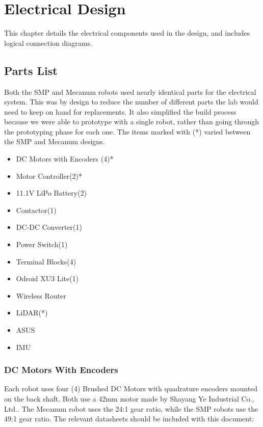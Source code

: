 
\chapter{Electrical Design}
\label{chap:elecdesign}

This chapter details the electrical components used in the design, and includes logical connection diagrams.

\section{Parts List}

Both the SMP and Mecanum robots used nearly identical parts for the electrical system. This was by design to reduce the number of different parts the lab would need to keep on hand for replacements. It also simplified the build process because we were able to prototype with a single robot, rather than going through the prototyping phase for each one. The items marked with (*) varied between the SMP and Mecanum designs.

\begin{itemize}
	\item{DC Motors with Encoders (4)*}
	\item{Motor Controller(2)*}
	\item{11.1V LiPo Battery(2)}
	\item{Contactor(1)}
	\item{DC-DC Converter(1)}
	\item{Power Switch(1)}
	\item{Terminal Blocks(4)}
	\item{Odroid XU3 Lite(1)}
	\item{Wireless Router}
	\item{LiDAR(*)}
	\item{ASUS}
	\item{IMU}
\end{itemize}

\subsection{DC Motors With Encoders}

Each robot uses four (4) Brushed DC Motors with quadrature encoders mounted on the back shaft. Both use a 42mm motor made by Shayang Ye Industrial Co., Ltd.. The Mecanum robot uses the 24:1 gear ratio, while the SMP robots use the 49:1 gear ratio. The relevant datasheets should be included with this document:

